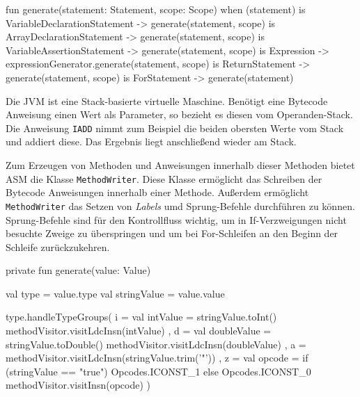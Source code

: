 \begin{KotlinCode}[numbers=none, caption={Die \texttt{generate()} Funktion von \texttt{StatementGenerator}, welche \textit{sealed classes} nutzt.}]
fun generate(statement: Statement, scope: Scope) {
    when (statement) {
        is VariableDeclarationStatement -> generate(statement, scope)
        is ArrayDeclarationStatement -> generate(statement, scope)
        is VariableAssertionStatement -> generate(statement, scope)
        is Expression -> expressionGenerator.generate(statement, scope)
        is ReturnStatement -> generate(statement, scope)
        is ForStatement -> generate(statement)
    }
}
\end{KotlinCode}

Die JVM ist eine Stack-basierte virtuelle Maschine. Benötigt eine Bytecode Anweisung einen Wert als Parameter, so bezieht es diesen vom Operanden-Stack. Die Anweisung \texttt{IADD} nimmt zum Beispiel die beiden obersten Werte vom Stack und addiert diese. Das Ergebnis liegt anschließend wieder am Stack.

Zum Erzeugen von Methoden und Anweisungen innerhalb dieser Methoden bietet ASM die Klasse \texttt{MethodWriter}. Diese Klasse ermöglicht das Schreiben der Bytecode Anweisungen innerhalb einer Methode. Außerdem ermöglicht \texttt{MethodWriter} das Setzen von \textit{Labels} umd Sprung-Befehle durchführen zu können. Sprung-Befehle sind für den Kontrollfluss wichtig, um in If-Verzweigungen nicht besuchte Zweige zu überspringen und um bei For-Schleifen an den Beginn der Schleife zurückzukehren.

\begin{KotlinCode}[numbers=none, caption={\texttt{generate()} Funktion, welche Wert-Literale erzeugt.}]
private fun generate(value: Value) {
    val type = value.type
    val stringValue = value.value

    type.handleTypeGroups(
        i = {
            val intValue = stringValue.toInt()
            methodVisitor.visitLdcInsn(intValue)
        },
        d = {
            val doubleValue = stringValue.toDouble()
            methodVisitor.visitLdcInsn(doubleValue)
        },
        a = { methodVisitor.visitLdcInsn(stringValue.trim('"')) },
        z = {
            val opcode = if (stringValue == "true") Opcodes.ICONST_1 else Opcodes.ICONST_0
            methodVisitor.visitInsn(opcode)
        }
    )
}
\end{KotlinCode}